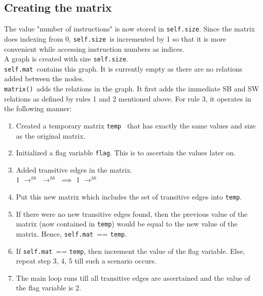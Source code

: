 \documentclass{article}
\newcommand{\var}[1]{\color{OliveGreen} \texttt{#1}\color{black}}
\newcommand{\fun}[2]{\color{Sepia}\texttt{#1(\color{Gray}\textit{#2}\color{Sepia})}\color{black}}
\newcommand{\hb}[2]{{#1} {\color{OliveGreen}$\rightarrow^{hb}$} \color{black}{#2}}
\begin{document}
\subsection{Creating the matrix}
The value "number of instructions" is now stored in \var{self.size}. Since the matrix does indexing from 0, \var{self.size }is incremented by 1 so that it is more convenient while accessing instruction numbers as indices.\\

A graph is created with size \var{self.size}.\\
\var{self.mat }contains this graph. It is currently empty as there are no relations added between the nodes.\\

\fun{matrix}{}\ adds the relations in the graph. It first adds the immediate SB and SW relations as defined by rules 1 and 2 mentioned above. For rule 3, it operates in the following manner:
\begin{enumerate}
    \item Created a temporary matrix \var{temp } that has exactly the same values and size as the original matrix.
    \item Initialized a flag variable \var{flag}. This is to ascertain the values later on.
    \item Added transitive edges in the matrix.\\
    \hb{\hb{1}{2}}{3} $\implies$ \hb{1}{3}
    \item Put this new matrix which includes the set of transitive edges into \var{temp}.
    \item If there were no new transitive edges found, then the previous value of the matrix (now contained in \var{temp}) would be equal to the new value of the matrix. Hence, \var{self.mat }== \var{temp}.
    \item If \var{self.mat }== \var{temp}, then increment the value of the flag variable. Else, repeat step 3, 4, 5 till such a scenario occurs.
    \item The main loop runs till all transitive edges are ascertained and the value of the flag variable is 2.

\end{enumerate}
\end{document}
